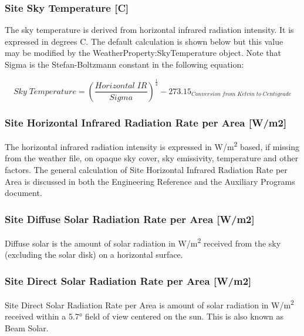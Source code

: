 \subsubsection{Site Sky Temperature {[}C{]}}\label{site-sky-temperature-c}

The sky temperature is derived from horizontal infrared radiation intensity. It is expressed in degrees C. The default calculation is shown below but this value may be modified by the WeatherProperty:SkyTemperature object. Note that Sigma is the Stefan-Boltzmann constant in the following equation:

\begin{equation}
Sky\;Temperature = {\left( {\frac{{Horizontal\;IR}}{{Sigma}}} \right)^{\frac{1}{4}}} - {273.15_{Conversion\;from\;Kelvin\;to\;Centigrade}}
\end{equation}

\subsubsection{Site Horizontal Infrared Radiation Rate per Area {[}W/m2{]}}\label{site-horizontal-infrared-radiation-rate-per-area-wm2}

The horizontal infrared radiation intensity is expressed in \si{W/m^2} based, if missing from the weather file, on opaque sky cover, sky emissivity, temperature and other factors. The general calculation of Site Horizontal Infrared Radiation Rate per Area is discussed in both the Engineering Reference and the Auxiliary Programs document.

\subsubsection{Site Diffuse Solar Radiation Rate per Area {[}W/m2{]}}\label{site-diffuse-solar-radiation-rate-per-area-wm2}

Diffuse solar is the amount of solar radiation in \si{W/m^2} received from the sky (excluding the solar disk) on a horizontal surface.

\subsubsection{Site Direct Solar Radiation Rate per Area {[}W/m2{]}}\label{site-direct-solar-radiation-rate-per-area-wm2}

Site Direct Solar Radiation Rate per Area is amount of solar radiation in \si{W/m^2} received within a \ang{5.7} field of view centered on the sun. This is also known as Beam Solar.

